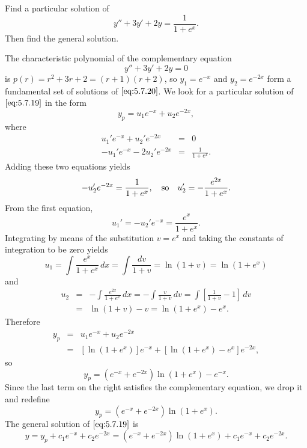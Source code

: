 \documentclass{ximera}
\begin{document}
\begin{example}\label{example:5.7.3}
 Find a particular solution of
\begin{equation}  \label{eq:5.7.19}
y''+3y'+2y=\frac{1}{1+e^x}.
\end{equation}
Then find the general solution.
 
 
\begin{explanation}
 
The characteristic polynomial of the complementary equation
\begin{equation} \label{eq:5.7.20}
y''+3y'+2y=0
\end{equation}
is $p(r)=r^2+3r+2=(r+1)(r+2)$, so
$y_1=e^{-x}$ and $y_2=e^{-2x}$ form a fundamental set of solutions of
$\eqref{eq:5.7.20}$.  We look for a particular solution of
$\eqref{eq:5.7.19}$ in the form
$$
y_p=u_1e^{-x}+u_2e^{-2x},
$$
where
\begin{eqnarray*}
u_1'e^{-x}+u_2'e^{-2x}&=&0\\
-u_1'e^{-x}-2u_2'e^{-2x}&=&\frac{1}{1+e^x}.
\end{eqnarray*}
Adding these two equations yields
$$
-u_2'e^{-2x}=\frac{1}{1+e^x},\quad\mbox{so}\quad
u_2'=-{e^{2x}\over 1+e^x}.
 $$
From the first equation,
$$
u_1'=-u_2'e^{-x}=\frac{e^x}{1+e^x}.
$$
Integrating by means of  the substitution $v=e^x$ and taking the
constants of integration to be zero  yields
 $$
u_1=\int\frac{e^x}{1+e^x}\,dx=\int \frac{dv}{1+v}
=\ln(1+v)=\ln(1+e^x)
$$
and
\begin{eqnarray*}
u_2&=&-\int\frac{e^{2x}}{1+e^x}\,dx=-\int \frac{v}{1+v}\,dv
=\int\left[\frac{1}{1+v}-1\right]\,dv \\
&=&\ln(1+v)-v=\ln(1+e^x)-e^x.
\end{eqnarray*}
Therefore
\begin{eqnarray*}
y_p&=&u_1e^{-x}+u_2e^{-2x}\\
&=&[\ln(1+e^x)]e^{-x}+\left[\ln(1+e^x)-e^x\right]e^{-2x},
\end{eqnarray*}
so
$$
y_p=\left(e^{-x}+e^{-2x}\right)\ln(1+e^x)-e^{-x}.
$$
Since the last term on the right satisfies the complementary
equation, we drop it and redefine
$$
y_p=\left(e^{-x}+e^{-2x}\right)\ln(1+e^x).
$$
The general solution of $\eqref{eq:5.7.19}$ is
$$
y=y_p+c_1e^{-x}+c_2e^{-2x}=\left(e^{-x}+e^{-2x}\right)\ln(1+e^x)
+c_1e^{-x}+c_2e^{-2x}.
$$
\end{explanation}
\end{example}
 
\end{document}
